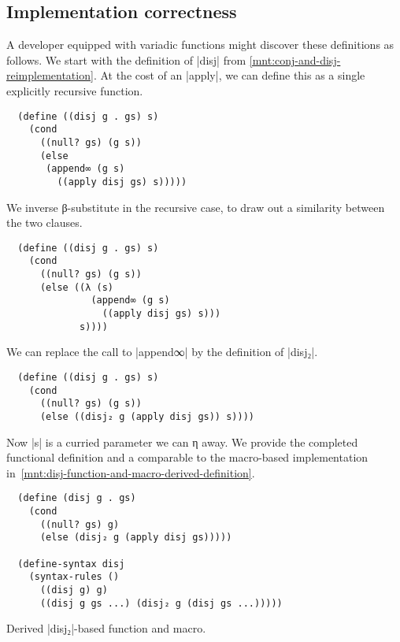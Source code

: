 \documentclass[sigplan,screen,draft,anonymous,review,natbib=false]{acmart}
\begin{document}
\subsection{Implementation correctness}

A developer equipped with variadic functions might discover these
definitions as follows. We start with the definition of
\rackinline|disj| from \cref{mnt:conj-and-disj-reimplementation}. At
the cost of an \rackinline|apply|, we can define this as a single
explicitly recursive function.

\begin{verbatim}
  (define ((disj g . gs) s)
    (cond
      ((null? gs) (g s))
      (else
       (append∞ (g s)
         ((apply disj gs) s)))))
\end{verbatim}

\noindent We inverse β-substitute in the recursive case, to draw out a
similarity between the two clauses.

\begin{listing}
\begin{verbatim}
  (define ((disj g . gs) s)
    (cond
      ((null? gs) (g s))
      (else ((λ (s)
               (append∞ (g s)
                 ((apply disj gs) s)))
             s))))
\end{verbatim}
\end{listing}

\noindent We can replace the call to \rackinline|append∞| by the definition
of \rackinline|disj₂|.

\begin{verbatim}
  (define ((disj g . gs) s)
    (cond
      ((null? gs) (g s))
      (else ((disj₂ g (apply disj gs)) s))))
\end{verbatim}

\noindent Now \rackinline|s| is a curried parameter we can η away. We
provide the completed functional definition and a comparable to the
macro-based implementation
in~\cref{mnt:disj-function-and-macro-derived-definition}.

\begin{listing}
\begin{verbatim}
  (define (disj g . gs)
    (cond
      ((null? gs) g)
      (else (disj₂ g (apply disj gs)))))

  (define-syntax disj
    (syntax-rules ()
      ((disj g) g)
      ((disj g gs ...) (disj₂ g (disj gs ...)))))
\end{verbatim}
  \caption{Derived \rackinline|disj₂|-based function and macro.}
  \label{mnt:disj-function-and-macro-derived-definition}
\end{listing}
\end{document}
